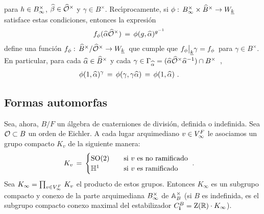 %
para $h\in\Idinf{B}$, $\hhat{\beta}\in\Idfin{\cal{O}}$ y
$\gamma\in B^{\times}$. Rec\'{\i}procamente, si
$\phi:\,\Idinf{B}\times\Idfin{B}\rightarrow W_{\peso{k}}$ satisface estas
condiciones, entonces la expresi\'{o}n
\begin{align*}
	f_{\phi}(\hhat{\alpha}\Idfin{\cal{O}}) & \,=\,
		\phi(g,\hhat{\alpha})^{g^{-1}}
\end{align*}
%
define una funci\'{o}n
\begin{math}
	f_{\phi}:\,\Idfin{B}/\Idfin{\cal{O}}\rightarrow W_{\peso{k}}
\end{math}~que cumple que
\begin{math}
	f_{\phi}\operadormatrices{\peso{k}}{\gamma}=f_{\phi}
\end{math}~para $\gamma\in B^{\times}$. En particular, para cada
$\hhat{\alpha}\in\Idfin{B}$ y cada
\begin{math}
	\gamma\in\Gamma_{\hhat{\alpha}}=
		(\hhat{\alpha}\Idfin{\cal{O}}\hhat{\alpha}^{-1})\cap B^{\times}
\end{math}~,
\begin{align*}
	\phi(1,\hhat{\alpha})^{\gamma} & \,=\,
		\phi(\gamma,\gamma\hhat{\alpha}) \,=\,\phi(1,\hhat{\alpha})
	\text{ .}
\end{align*}
%

\subsection{Formas automorfas}%
Sea, ahora, $B/F$ un \'{a}lgebra de cuaterniones de divisi\'{o}n, definida o
indefinida. Sea $\cal{O}\subset B$ un orden de Eichler. A cada lugar
arquimediano $v\in\lugares[\infty]{F}$ le asociamos un grupo compacto $K_{v}$
de la siguiente manera:
\begin{align*}
	K_{v} & \,=\,
		\begin{cases}
			\SO{2} & \quad\text{si }v
				\text{ es no ramificado} \\
			\bb{H}^{1} & \quad\text{si }v
				\text{ es ramificado}
		\end{cases}
	\text{ .}
\end{align*}
%
Sea $K_{\infty}=\prod_{v\in\lugares[\infty]{F}}\,K_{v}$ el producto de estos
grupos. Entonces $K_{\infty}$ es un subgrupo compacto y conexo de la parte
arquimediana $\Idinf{B}$ de $\ideles{B}$ (si $B$ es indefinida, es el subgrupo
compacto conexo maximal del estabilizador
$C^{B}_{\mathbf{i}}=\centre(\bb{R})\cdot K_{\infty}$).

